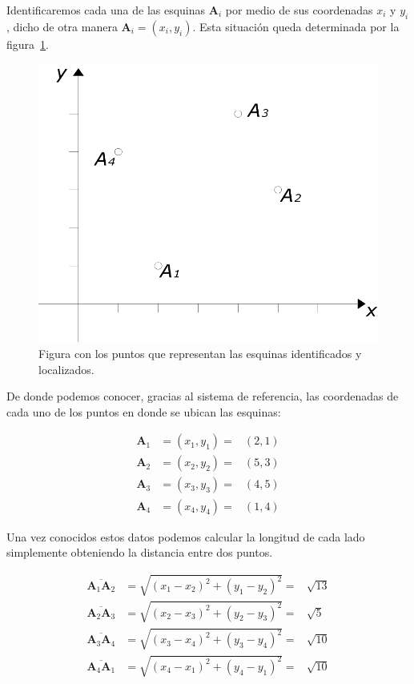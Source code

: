 Identificaremos cada una de las esquinas $\textbf{A}_i$ por medio de sus coordenadas $x_i$ y $y_i$, dicho de otra manera $\textbf{A}_i = ( x_i , y_i)$.
Esta situación queda determinada por la figura~\ref{cuadrilateroDiagrama:fig}.

\begin{figure}
 \centering
 \includegraphics[]{Img/cuadrilatero_diagrama}
 \caption[Cuadrilátero localizado en el espacio]{ 
 Figura con los puntos que representan las esquinas identificados y localizados.
 } \label{cuadrilateroDiagrama:fig}
\end{figure}

De donde podemos conocer, gracias al sistema de referencia, las coordenadas de cada uno de los puntos en donde se ubican las esquinas:

\begin{eqnarray}
\textbf{A}_1 & =  (x_1, y_1)  = & (2,1) \nonumber \\
\textbf{A}_2 & =  (x_2, y_2)  = & (5,3) \nonumber \\
\textbf{A}_3 & =  (x_3, y_3)  = & (4,5) \nonumber \\
\textbf{A}_4 & =  (x_4, y_4)  = & (1,4) \nonumber
\end{eqnarray}

Una vez conocidos estos datos podemos calcular la longitud de cada lado simplemente obteniendo la distancia entre dos puntos.

\begin{eqnarray}
\overline{\textbf{A}_1 \textbf{A}_2} & =  \sqrt{(x_1 - x_2)^2 + (y_1 - y_2)^2}  = & \sqrt{13}  \nonumber \\
\overline{\textbf{A}_2 \textbf{A}_3} & =  \sqrt{(x_2 - x_3)^2 + (y_2 - y_3)^2}  = & \sqrt{5}   \nonumber \\
\overline{\textbf{A}_3 \textbf{A}_4} & =  \sqrt{(x_3 - x_4)^2 + (y_3 - y_4)^2}  = & \sqrt{10}  \nonumber \\
\overline{\textbf{A}_4 \textbf{A}_1} & =  \sqrt{(x_4 - x_1)^2 + (y_4 - y_1)^2}  = & \sqrt{10}  \nonumber
\end{eqnarray}

